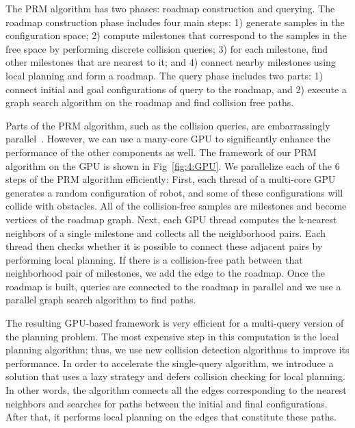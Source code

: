 The PRM algorithm has two phases: roadmap construction and querying. The roadmap construction phase includes four main steps: 1) generate samples in the configuration space; 2) compute milestones that correspond to the samples in the free space by performing discrete collision queries; 3) for each milestone, find other milestones that are nearest to it; and 4) connect nearby milestones using local planning and form a roadmap. The query phase includes two parts: 1) connect initial and goal configurations of query to the roadmap, and 2) execute a graph search algorithm on the roadmap and find collision free paths.

Parts of the PRM algorithm, such as the collision queries, are embarrassingly parallel~\cite{Amato99}. However, we can use a many-core GPU to significantly enhance the performance of the other components as well. The framework of our PRM algorithm on the GPU is shown in Fig~\ref{fig:4:GPU}. We parallelize each of the $6$ steps of the PRM algorithm efficiently: First, each thread of a multi-core GPU generates a random configuration of robot, and some of these configurations will collide with obstacles. All of the collision-free samples are milestones and become vertices of the roadmap graph. Next, each GPU thread computes the k-nearest neighbors of a single milestone and collects all the neighborhood pairs. Each thread then checks whether it is possible to connect these adjacent pairs by performing local planning. If there is a collision-free path between that neighborhood pair of milestones, we add the edge to the roadmap. Once the roadmap is built, queries are connected to the roadmap in parallel and we use a parallel graph search algorithm to find paths.

The resulting GPU-based framework is very efficient for a multi-query version of the planning problem. The most expensive step in this computation is the local planning algorithm; thus, we use new collision detection algorithms to improve its performance. In order to accelerate the single-query algorithm, we introduce a solution that uses a lazy strategy and defers collision checking for local planning. In other words, the algorithm connects all the edges corresponding to the nearest neighbors and searches for paths between the initial and final configurations. After that, it performs local planning on the edges that constitute these paths.

